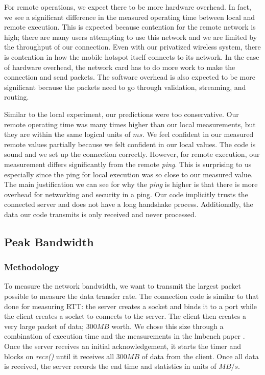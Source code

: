 \documentclass[sigconf]{acmart}
\begin{document}
For remote operations, we expect there to be more hardware overhead. In fact, we see a significant difference in the measured operating time between local and remote execution. This is expected because contention for the remote network is high; there are many users attempting to use this network and we are limited by the throughput of our connection. Even with our privatized wireless system, there is contention in how the mobile hotspot itself connects to its network. In the case of hardware overhead, the network card has to do more work to make the connection and send packets. The software overhead is also expected to be more significant because the packets need to go through validation, streaming, and routing.

Similar to the local experiment, our predictions were too conservative. Our remote operating time was many times higher than our local measurements, but they are within the same logical units of $ms$. We feel confident in our measured remote values partially because we felt confident in our local values. The code is sound and we set up the connection correctly. However, for remote execution, our measurement differs significantly from the remote \textit{ping}. This is surprising to us especially since the ping for local execution was so close to our measured value. The main justification we can see for why the \textit{ping} is higher is that there is more overhead for networking and security in a ping. Our code implicitly trusts the connected server and does not have a long handshake process. Additionally, the data our code transmits is only received and never processed.

\subsection{Peak Bandwidth}
\subsubsection{Methodology}
To measure the network bandwidth, we want to transmit the largest packet possible to measure the data transfer rate. The connection code is similar to that done for measuring RTT: the server creates a socket and binds it to a port while the client creates a socket to connects to the server. The client then creates a very large packet of data; $300MB$ worth. We chose this size through a combination of execution time and the measurements in the lmbench paper \cite{lmbench}. Once the server receives an initial acknowledgement, it starts the timer and blocks on \textit{recv()} until it receives all $300MB$ of data from the client. Once all data is received, the server records the end time and statistics in units of $MB/s$.
\end{document}
